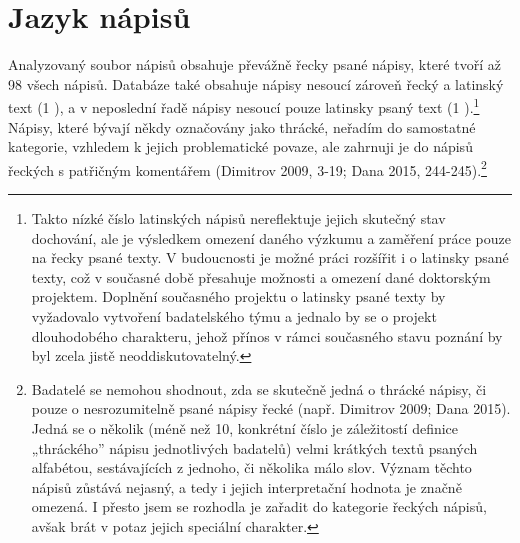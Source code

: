 \section[jazyk-nápisů]{Jazyk nápisů}

Analyzovaný soubor nápisů obsahuje převážně řecky psané nápisy, které tvoří až 98  všech nápisů. Databáze také obsahuje nápisy nesoucí zároveň řecký a latinský text (1 ), a v neposlední řadě nápisy nesoucí pouze latinsky psaný text (1 ).\footnote{Takto nízké číslo latinských nápisů nereflektuje jejich skutečný stav dochování, ale je výsledkem omezení daného výzkumu a zaměření práce pouze na řecky psané texty. V budoucnosti je možné práci rozšířit i o latinsky psané texty, což v současné době přesahuje možnosti a omezení dané doktorským projektem. Doplnění současného projektu o latinsky psané texty by vyžadovalo vytvoření badatelského týmu a jednalo by se o projekt dlouhodobého charakteru, jehož přínos v rámci současného stavu poznání by byl zcela jistě neoddiskutovatelný.} Nápisy, které bývají někdy označovány jako thrácké, neřadím do samostatné kategorie, vzhledem k jejich problematické povaze, ale zahrnuji je do nápisů řeckých s patřičným komentářem (Dimitrov 2009, 3-19; Dana 2015, 244-245).\footnote{Badatelé se nemohou shodnout, zda se skutečně jedná o thrácké nápisy, či pouze o nesrozumitelně psané nápisy řecké (např. Dimitrov 2009; Dana 2015). Jedná se o několik (méně než 10, konkrétní číslo je záležitostí definice „thráckého” nápisu jednotlivých badatelů) velmi krátkých textů psaných alfabétou, sestávajících z jednoho, či několika málo slov. Význam těchto nápisů zůstává nejasný, a tedy i jejich interpretační hodnota je značně omezená. I přesto jsem se rozhodla je zařadit do kategorie řeckých nápisů, avšak brát v potaz jejich speciální charakter.}

